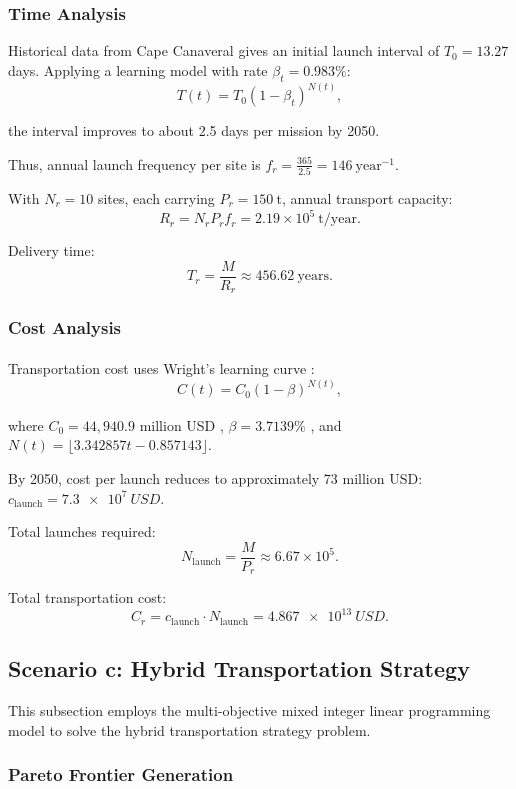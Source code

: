 \documentclass[12pt]{mcmthesis}
\begin{document}
\subsubsection{Time Analysis}
Historical data from Cape Canaveral gives an initial launch interval of \(T_0 = 13.27\) days. Applying a learning model with rate \(\beta_t = 0.983\%\):
\[
    T(t) = T_0 (1 - \beta_t)^{N(t)},
\]

the interval improves to about 2.5 days per mission by 2050.

Thus, annual launch frequency per site is $
    f_r = \frac{365}{2.5} = 146\ \mathrm{year^{-1}}$.

With \(N_r = 10\) sites, each carrying \(P_r = 150\ \mathrm{t}\), annual transport capacity:
\[
    R_r = N_r P_r f_r = 2.19 \times 10^5\ \mathrm{t/year}.
\]

Delivery time:
\[
    T_r = \frac{M}{R_r} \approx 456.62\ \text{years}.
\]
\subsubsection{Cost Analysis}

Transportation cost uses Wright's learning curve \textsuperscript{\cite{1}\cite{2}}:
\[
    C(t) = C_0 (1 - \beta)^{N(t)},
\]

where \(C_0 = 44{,}940.9\) million USD \textsuperscript{\cite{4}}, \(\beta = 3.7139\%\) \textsuperscript{\cite{5}\cite{6}}, and \(N(t) = \lfloor 3.342857t - 0.857143 \rfloor\).

By 2050, cost per launch reduces to approximately 73 million USD: $c_{\text{launch}} = \SI{7.3e7}{USD}.$

Total launches required:
\[
    N_{\text{launch}} = \frac{M}{P_r} \approx 6.67 \times 10^5.
\]

Total transportation cost:
\[
    C_r = c_{\text{launch}} \cdot N_{\text{launch}} = \SI{4.867e13}{USD}.
\]

\subsection{Scenario c: Hybrid Transportation Strategy}

This subsection employs the multi-objective mixed integer linear programming model to solve the hybrid transportation strategy problem.

\subsubsection{Pareto Frontier Generation}
\end{document}
